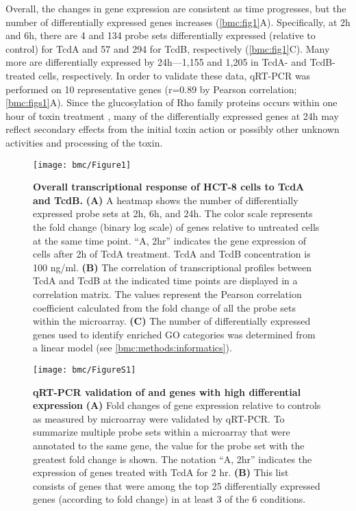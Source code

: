 Overall, the changes in gene expression are consistent as 
time progresses, but the number of differentially expressed 
genes increases (\autoref{bmc:fig1}A). Specifically, at 2h 
and 6h, there are 4 and 134 probe sets differentially 
expressed (relative to control) for TcdA and 57 and 294 for 
TcdB, respectively (\autoref{bmc:fig1}C).  Many more are 
differentially expressed by 24h—1,155 and 1,205 in TcdA- and 
TcdB-treated cells, respectively. In order to validate these 
data, qRT-PCR was performed on 10 representative genes 
(r=0.89 by Pearson correlation; \autoref{bmc:figs1}A). Since 
the glucosylation of Rho family proteins occurs within one hour 
of toxin treatment \cite{ChavesOlarte:1997cs}, many of the 
differentially expressed genes at 24h may reflect secondary 
effects from the initial toxin action or possibly other unknown 
activities and processing of the toxin.

\begin{figure}[h!]
  \centering
  \texttt{[image: bmc/Figure1]}
  \caption[Overall transcriptional response of HCT-8 
  cells to TcdA and TcdB]{
       \textbf{Overall transcriptional response of 
       HCT-8 cells to TcdA and TcdB.}
       \textbf{(A)} A heatmap shows the number of differentially 
       expressed probe sets at 2h, 6h, and 24h. The color scale 
       represents the fold change (binary log scale) of genes 
       relative to untreated cells at the same time point. 
       ``A, 2hr'' indicates the gene expression of cells 
       after 2h of TcdA treatment. TcdA and TcdB concentration 
       is 100 ng/ml.
       \textbf{(B)} The correlation of transcriptional 
       profiles between TcdA and TcdB at the indicated 
       time points are displayed in a correlation matrix. 
       The values represent the Pearson correlation 
       coefficient calculated from the fold change of 
       all the probe sets within the microarray.
       \textbf{(C)} The number of differentially expressed 
       genes used to identify enriched GO categories was 
       determined from a linear model 
       (see \ref{bmc:methods:informatics}).
}
  \label{bmc:fig1}
\end{figure}

\begin{figure}[h!]
  \centering
  \texttt{[image: bmc/FigureS1]}
  \caption[qRT-PCR validation of and genes with high differential expression]{
  \textbf{qRT-PCR validation of and genes with high differential expression}
  \textbf{(A)} Fold changes of gene expression relative 
  to controls as measured by microarray 
  were validated by qRT-PCR. To summarize 
  multiple probe sets within a microarray that 
  were annotated to the same gene, the value for 
  the probe set with the 
  greatest fold change is shown. The notation 
  ``A, 2hr'' indicates the expression 
  of genes treated with TcdA for 2 hr. 
  \textbf{(B)} This list consists of genes that 
  were among the top 25 differentially expressed 
  genes (according to fold change) in at 
  least 3 of the 6 conditions.}
  \label{bmc:figs1}
\end{figure}


